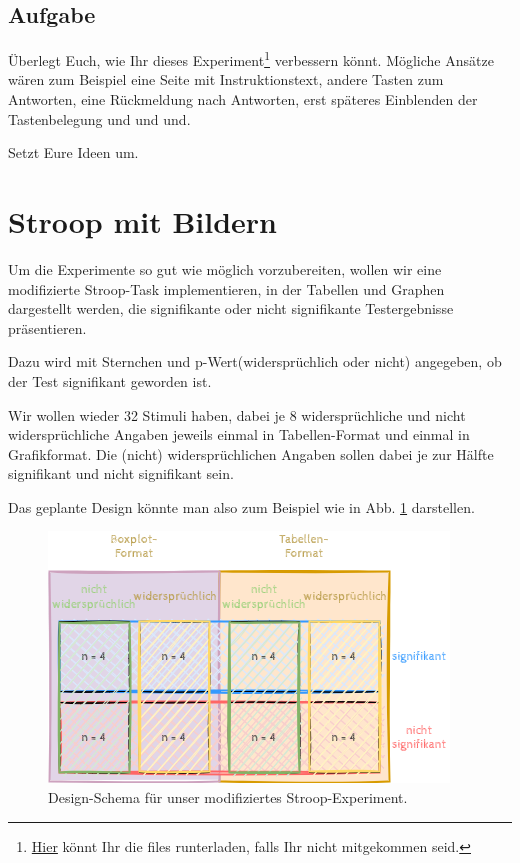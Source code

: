 \documentclass[
]{book}
\begin{document}
\hypertarget{aufgabe-13}{%
\subsection{Aufgabe}\label{aufgabe-13}}

Überlegt Euch, wie Ihr dieses Experiment\footnote{\href{https://gitlab.pavlovia.org/M.Brede/ms_fov_stroop}{Hier} könnt Ihr die files runterladen, falls Ihr nicht mitgekommen seid.} verbessern könnt.
Mögliche Ansätze wären zum Beispiel eine Seite mit Instruktionstext, andere Tasten zum Antworten, eine Rückmeldung nach Antworten, erst späteres Einblenden der Tastenbelegung und und und.

Setzt Eure Ideen um.

\hypertarget{stroop-mit-bildern}{%
\section{Stroop mit Bildern}\label{stroop-mit-bildern}}

Um die Experimente so gut wie möglich vorzubereiten, wollen wir eine modifizierte Stroop-Task implementieren, in der Tabellen und Graphen dargestellt werden, die signifikante oder nicht signifikante Testergebnisse präsentieren.

Dazu wird mit Sternchen und p-Wert(widersprüchlich oder nicht) angegeben, ob der Test signifikant geworden ist.

Wir wollen wieder 32 Stimuli haben, dabei je 8 widersprüchliche und nicht widersprüchliche Angaben jeweils einmal in Tabellen-Format und einmal in Grafikformat. Die (nicht) widersprüchlichen Angaben sollen dabei je zur Hälfte signifikant und nicht signifikant sein.

Das geplante Design könnte man also zum Beispiel wie in Abb. \ref{fig:design} darstellen.



\begin{figure}

{\centering \includegraphics[width=.8\textwidth]{imgs/design} 

}

\caption{Design-Schema für unser modifiziertes Stroop-Experiment.}\label{fig:design}
\end{figure}
\end{document}
